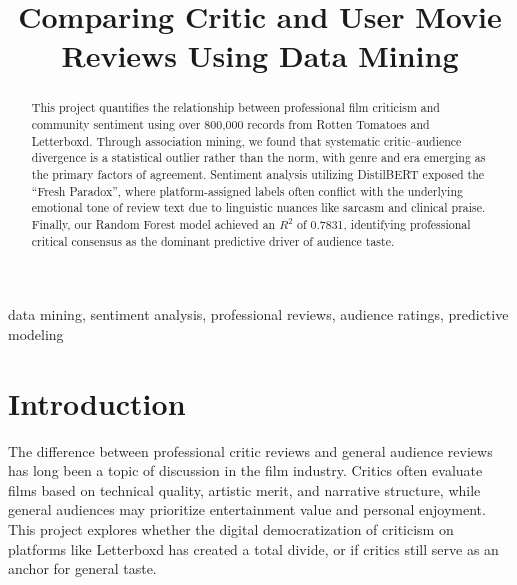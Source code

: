 \documentclass[conference]{IEEEtran}
\begin{document}
\title{Comparing Critic and User Movie Reviews Using Data Mining}

\author{
  \and
  \and
  \and
}

\maketitle

\begin{abstract}
  This project quantifies the relationship between professional film criticism and community sentiment using over 800,000 records from Rotten Tomatoes and Letterboxd. Through association mining, we found that systematic critic--audience divergence is a statistical outlier rather than the norm, with genre and era emerging as the primary factors of agreement. Sentiment analysis utilizing DistilBERT exposed the \enquote{Fresh Paradox}, where platform-assigned labels often conflict with the underlying emotional tone of review text due to linguistic nuances like sarcasm and clinical praise. Finally, our Random Forest model achieved an $R^2$ of 0.7831, identifying professional critical consensus as the dominant predictive driver of audience taste.
\end{abstract}


\begin{IEEEkeywords}
  data mining, sentiment analysis, professional reviews, audience ratings, predictive modeling
\end{IEEEkeywords}

\section{Introduction}
The difference between professional critic reviews and general audience reviews has long been a topic of discussion in the film industry. Critics often evaluate films based on technical quality, artistic merit, and narrative structure, while general audiences may prioritize entertainment value and personal enjoyment. This project explores whether the digital democratization of criticism on platforms like Letterboxd has created a total divide, or if critics still serve as an anchor for general taste.
\end{document}

